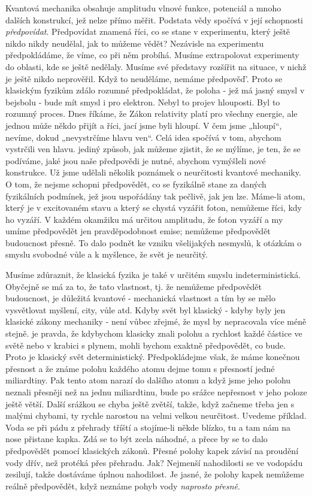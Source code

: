     Kvantová mechanika obsahuje amplitudu vlnové funkce, potenciál a mnoho dalších konstrukcí, jež
    nelze přímo měřit. Podstata vědy spočívá v její schopnosti \emph{předpovídat}. Předpovídat
    znamená říci, co se stane v experimentu, který ještě nikdo nikdy neudělal, jak to můžeme vědět?
    Nezávisle na experimentu předpokládáme, že víme, co při něm probíhá. Musíme extrapolovat
    experimenty do oblasti, kde se ještě nedělaly. Musíme své představy rozšířit na situace, v nichž
    je ještě nikdo neprověřil. Když to neuděláme, nemáme předpověď'. Proto se klasickým fyzikům
    zdálo rozumné předpokládat, že poloha - jež má jasný smysl v bejsbolu - bude mít smysl i pro
    elektron. Nebyl to projev hlouposti. Byl to rozumný proces. Dnes říkáme, že Zákon relativity
    platí pro všechny energie, ale jednou může někdo přijít a říci, jací jsme byli hloupí. V čem
    jsme „hloupí“, nevíme, dokud „nevystrčíme hlavu ven“. Celá idea spočívá v tom, abychom vystrčili
    ven hlavu. jediný způsob, jak můžeme zjistit, že se mýlíme, je ten, že se podíváme, jaké jsou
    naše předpovědi je nutné, abychom vymýšleli nové konstrukce. Už jsme udělali několik poznámek o
    neurčitosti kvantové mechaniky. O tom, že nejsme schopni předpovědět, co se fyzikálně stane za
    daných fyzikálních podmínek, jež jsou uspořádány tak pečlivě, jak jen lze. Máme-li atom, který
    je v excitovaném stavu a který se chystá vyzářit foton, nemůžeme říci, kdy ho vyzáří. V každém
    okamžiku má určitou amplitudu, že foton vyzáří a my umíme předpovědět jen pravděpodobnost emise;
    nemůžeme předpovědět budoucnost přesně. To dalo podnět ke vzniku všelijakých nesmyslů, k otázkám
    o smyslu svobodné vůle a k myšlence, že svět je neurčitý. 
    
    Musíme zdůraznit, že klasická fyzika je také v určitém smyslu indeterministická. Obyčejně se má
    za to, že tato vlastnost, tj. že nemůžeme předpovědět budoucnost, je důležitá kvantové -
    mechanická vlastnost a tím by se mělo vysvětlovat myšlení, city, vůle atd. Kdyby svět byl
    klasický - kdyby byly jen klasické zákony mechaniky - není vůbec zřejmé, že mysl by nepracovala
    více méně stejně. je pravda, že kdybychom klasicky znali polohu a rychlost každé částice ve
    světě nebo v krabici s plynem, mohli bychom exaktně předpovědět, co bude. Proto je klasický svět
    deterministický. Předpokládejme však, že máme konečnou přesnost a že známe polohu každého atomu
    dejme tomu s přesností jedné miliardtiny. Pak tento atom narazí do dalšího atomu a když jsme
    jeho polohu neznali přesněji než na jednu miliardtinu, bude po srážce nepřesnost v jeho poloze
    ještě větší. Další srážkou se chyba ještě zvětší, takže, když začneme třeba jen s malými
    chybami, ty rychle narostou na velmi velkou neurčitost. Uvedeme příklad. Voda se při pádu z
    přehrady tříští a stojíme-li někde blízko, tu a tam nám na nose přistane kapka. Zdá se to být
    zcela náhodné, a přece by se to dalo předpovědět pomocí klasických zákonů. Přesné polohy kapek
    závisí na proudění vody dřív, než protéká přes přehradu. Jak? Nejmenší nahodilosti se ve
    vodopádu zesilují, takže dostáváme úplnou nahodilost. Je jasné, že polohy kapek nemůžeme reálně
    předpovědět, když neznáme pohyb vody \emph{naprosto přesně}. 
    

